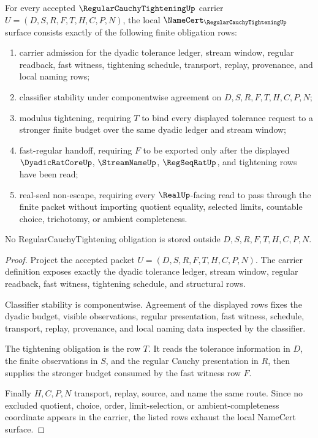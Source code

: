 \begin{theorem}
\label{thm:regular-cauchy-tightening-namecert-obligations}
For every accepted $\RegularCauchyTighteningUp$ carrier $U=(D,S,R,F,T,H,C,P,N)$, the local $\NameCert_{\RegularCauchyTighteningUp}$ surface consists exactly of the following finite obligation rows:
\begin{enumerate}
\item carrier admission for the dyadic tolerance ledger, stream window, regular readback, fast witness, tightening schedule, transport, replay, provenance, and local naming rows;
\item classifier stability under componentwise agreement on $D,S,R,F,T,H,C,P,N$;
\item modulus tightening, requiring $T$ to bind every displayed tolerance request to a stronger finite budget over the same dyadic ledger and stream window;
\item fast-regular handoff, requiring $F$ to be exported only after the displayed $\DyadicRatCoreUp$, $\StreamNameUp$, $\RegSeqRatUp$, and tightening rows have been read;
\item real-seal non-escape, requiring every $\RealUp$-facing read to pass through the finite packet without importing quotient equality, selected limits, countable choice, trichotomy, or ambient completeness.
\end{enumerate}
No RegularCauchyTightening obligation is stored outside $D,S,R,F,T,H,C,P,N$.
\end{theorem}
\begin{proof}
Project the accepted packet $U=(D,S,R,F,T,H,C,P,N)$. The carrier definition exposes exactly the dyadic tolerance ledger, stream window, regular readback, fast witness, tightening schedule, and structural rows.

Classifier stability is componentwise. Agreement of the displayed rows fixes the dyadic budget, visible observations, regular presentation, fast witness, schedule, transport, replay, provenance, and local naming data inspected by the classifier.

The tightening obligation is the row $T$. It reads the tolerance information in $D$, the finite observations in $S$, and the regular Cauchy presentation in $R$, then supplies the stronger budget consumed by the fast witness row $F$.

Finally $H,C,P,N$ transport, replay, source, and name the same route. Since no excluded quotient, choice, order, limit-selection, or ambient-completeness coordinate appears in the carrier, the listed rows exhaust the local NameCert surface.
\end{proof}

